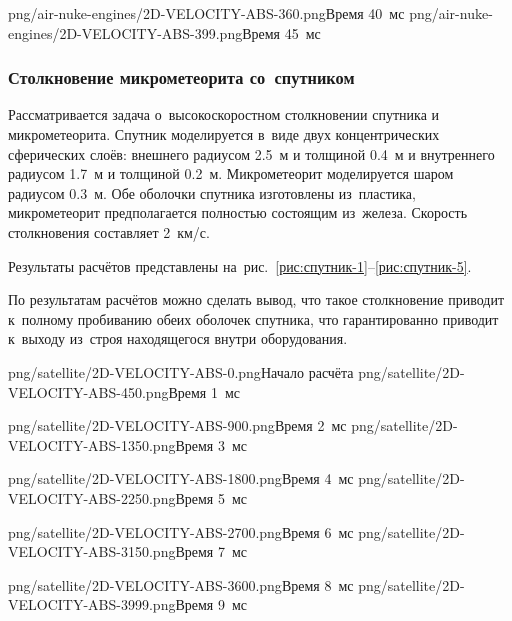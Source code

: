 \documentclass[thesis.tex]{subfiles}
\begin{document}
        {png/air-nuke-engines/2D-VELOCITY-ABS-360.png}{Время 40~мс}
        {png/air-nuke-engines/2D-VELOCITY-ABS-399.png}{Время 45~мс}

\FloatBarrier

\subsubsection{Столкновение микрометеорита со~спутником}

Рассматривается задача о~высокоскоростном столкновении спутника и микрометеорита. Спутник моделируется в~виде двух
концентрических сферических слоёв: внешнего радиусом 2.5~м и толщиной 0.4~м и внутреннего радиусом 1.7~м и толщиной 0.2~м.
Микрометеорит моделируется шаром радиусом 0.3~м. Обе оболочки спутника изготовлены из~пластика, микрометеорит
предполагается полностью состоящим из~железа. Скорость столкновения составляет 2~км/с.

Результаты расчётов представлены на~рис.~\ref{рис:спутник-1}--\ref{рис:спутник-5}.

По результатам расчётов можно сделать вывод, что такое столкновение приводит к~полному пробиванию обеих оболочек
спутника, что гарантированно приводит к~выходу из~строя находящегося внутри оборудования.


        {png/satellite/2D-VELOCITY-ABS-0.png}{Начало расчёта}
        {png/satellite/2D-VELOCITY-ABS-450.png}{Время 1~мс}

        {png/satellite/2D-VELOCITY-ABS-900.png}{Время 2~мс}
        {png/satellite/2D-VELOCITY-ABS-1350.png}{Время 3~мс}

        {png/satellite/2D-VELOCITY-ABS-1800.png}{Время 4~мс}
        {png/satellite/2D-VELOCITY-ABS-2250.png}{Время 5~мс}

        {png/satellite/2D-VELOCITY-ABS-2700.png}{Время 6~мс}
        {png/satellite/2D-VELOCITY-ABS-3150.png}{Время 7~мс}

        {png/satellite/2D-VELOCITY-ABS-3600.png}{Время 8~мс}
        {png/satellite/2D-VELOCITY-ABS-3999.png}{Время 9~мс}
\end{document}
